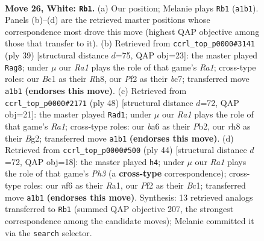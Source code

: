 \documentclass[11pt]{article}
\begin{document}
\clearpage

\begin{figure}[p]\centering
\begin{subfigure}{0.46\textwidth}\centering
\resizebox{\linewidth}{!}{%
\newchessgame
\chessboard[
  setfen={r3k2r/5p2/b4n2/p7/3pp2p/7P/PP1K1PB1/R1B4R w kq - 0 26},
  showmover=false,
  pgfstyle=straightmove, color=movearrow, markmove={a1-b1}
]}
\caption{}
\end{subfigure}\hfill
\begin{subfigure}{0.46\textwidth}\centering
\resizebox{\linewidth}{!}{%
\newchessgame
\chessboard[
  setfen={r6r/ppBb1k2/2p2p2/8/3N2Pb/5P2/PPP5/R2R2K1 b - - 0 20},
  showmover=false,
  pgfstyle=straightmove, color=movearrow, markmove={a8-g8}
]}
\caption{}
\end{subfigure}
\\[4pt]
\begin{subfigure}{0.46\textwidth}\centering
\resizebox{\linewidth}{!}{%
\newchessgame
\chessboard[
  setfen={2r4k/pp2r1bp/5pp1/4n3/3R2P1/6P1/PP3BBP/R5K1 w - - 2 25},
  showmover=false,
  pgfstyle=straightmove, color=movearrow, markmove={a1-d1}
]}
\caption{}
\end{subfigure}\hfill
\begin{subfigure}{0.46\textwidth}\centering
\resizebox{\linewidth}{!}{%
\newchessgame
\chessboard[
  setfen={r1b1k2r/5p2/1p6/4p1Pp/3nP3/7P/PP6/R1BBK2R w KQkq - 0 23},
  showmover=false,
  pgfstyle=straightmove, color=movearrow, markmove={h3-h4}
]}
\caption{}
\end{subfigure}
\caption{\textbf{Move 26, White: \texttt{Rb1}.} (a) Our position; Melanie plays \texttt{Rb1} (\texttt{a1b1}). Panels (b)--(d) are the retrieved master positions whose correspondence most drove this move (highest QAP objective among those that transfer to it). (b) Retrieved from \texttt{ccrl\_top\_p0000\#3141} (ply 39) [structural distance $d$=75, QAP obj=23]: the master played \texttt{Rag8}; under $\mu$ our \emph{Ra1} plays the role of that game's \emph{Ra1}; cross-type roles: our \emph{B}c1 as their \emph{R}h8, our \emph{P}f2 as their \emph{b}c7; transferred move \texttt{a1b1} \textbf{(endorses this move)}. (c) Retrieved from \texttt{ccrl\_top\_p0000\#2171} (ply 48) [structural distance $d$=72, QAP obj=21]: the master played \texttt{Rad1}; under $\mu$ our \emph{Ra1} plays the role of that game's \emph{Ra1}; cross-type roles: our \emph{b}a6 as their \emph{P}b2, our \emph{r}h8 as their \emph{B}g2; transferred move \texttt{a1b1} \textbf{(endorses this move)}. (d) Retrieved from \texttt{ccrl\_top\_p0000\#500} (ply 44) [structural distance $d$=72, QAP obj=18]: the master played \texttt{h4}; under $\mu$ our \emph{Ra1} plays the role of that game's \emph{Ph3} (a \textbf{cross-type} correspondence); cross-type roles: our \emph{n}f6 as their \emph{R}a1, our \emph{P}f2 as their \emph{B}c1; transferred move \texttt{a1b1} \textbf{(endorses this move)}. Synthesis: 13 retrieved analogs transferred to \texttt{Rb1} (summed QAP objective 207, the strongest correspondence among the candidate moves); Melanie committed it via the \texttt{search} selector.}
\label{fig:thought-m50}
\end{figure}
\end{document}
